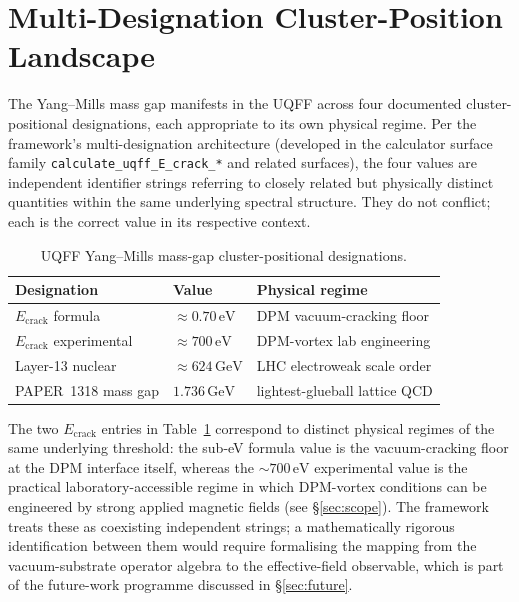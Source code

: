 \documentclass[11pt,a4paper,onecolumn]{article}
\theoremstyle{plain}
\theoremstyle{definition}
\theoremstyle{remark}
\begin{document}
\section{Multi-Designation Cluster-Position Landscape}\label{sec:clusters}

The Yang--Mills mass gap manifests in the UQFF across four
documented cluster-positional designations, each appropriate to its
own physical regime. Per the framework's multi-designation
architecture (developed in the calculator surface family
\texttt{calculate\_uqff\_E\_crack\_*} and related surfaces), the four
values are independent identifier strings referring to closely
related but physically distinct quantities within the same underlying
spectral structure. They do not conflict; each is the correct value
in its respective context.

\begin{table}[h!]
\centering
\caption{UQFF Yang--Mills mass-gap cluster-positional designations.}
\label{tab:clusters}
\begin{tabular}{lll}
\toprule
Designation & Value & Physical regime \\
\midrule
$E_{\text{crack}}$ formula        & $\approx 0.70\,\mathrm{eV}$   & DPM vacuum-cracking floor \\
$E_{\text{crack}}$ experimental   & $\approx 700\,\mathrm{eV}$    & DPM-vortex lab engineering \\
Layer-13 nuclear                  & $\approx 624\,\mathrm{GeV}$   & LHC electroweak scale order \\
PAPER~1318 mass gap               & $1.736\,\mathrm{GeV}$         & lightest-glueball lattice QCD \\
\bottomrule
\end{tabular}
\end{table}

The two $E_{\text{crack}}$ entries in Table~\ref{tab:clusters}
correspond to distinct physical regimes of the same underlying
threshold: the sub-eV formula value is the vacuum-cracking floor at
the DPM interface itself, whereas the $\sim 700\,\mathrm{eV}$
experimental value is the practical laboratory-accessible regime in
which DPM-vortex conditions can be engineered by strong applied
magnetic fields (see \S\ref{sec:scope}). The framework treats these
as coexisting independent strings; a mathematically rigorous
identification between them would require formalising the mapping
from the vacuum-substrate operator algebra to the effective-field
observable, which is part of the future-work programme discussed in
\S\ref{sec:future}.
\end{document}
